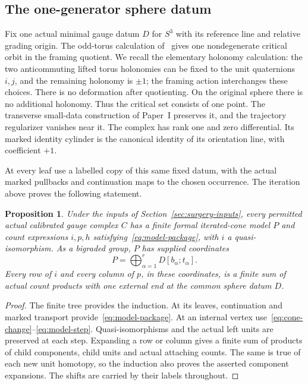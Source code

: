 \documentclass[11pt]{amsart}
\newtheorem{proposition}[theorem]{Proposition}
\theoremstyle{definition}
\theoremstyle{remark}
\theoremstyle{plain}
\begin{document}
\subsection{The one-generator sphere datum}
Fix one actual minimal gauge datum $D$ for $S^3$ with its reference
line and relative grading origin. The odd-torus calculation
of~\cite[Section~7.6]{Scaduto} gives one nondegenerate critical
orbit in the framing quotient. We recall the elementary holonomy
calculation: the two anticommuting
lifted torus holonomies can be fixed to the unit quaternions
$i,j$, and the remaining holonomy is $\pm1$; the framing action
interchanges these choices. There is no deformation after
quotienting. On the original sphere there is no additional
holonomy. Thus the critical set consists of one point.
The transverse small-data construction of Paper~I preserves it,
and the trajectory regularizer vanishes near it. The complex
has rank one and zero differential. Its marked identity cylinder
is the canonical identity of its orientation line, with
coefficient $+1$.

At every leaf use a labelled copy of this same fixed datum, with
the actual marked pullbacks and continuation maps to the chosen
occurrence. The iteration above proves the following statement.

\begin{proposition}\label{prop:finite-model}
Under the inputs of Section~\ref{sec:surgery-inputs}, every
permitted actual calibrated gauge complex $C$ has a finite
formal iterated-cone model $P$ and count expressions
$i,p,h$ satisfying~\eqref{eq:model-package}, with $i$ a
quasi-isomorphism. As a bigraded group, $P$ has supplied coordinates
\begin{equation}\label{eq:leaf-model}
 P=\bigoplus_{\alpha=1}^r D[b_\alpha;t_\alpha].
\end{equation}
Every row of $i$ and every column of $p$, in these coordinates,
is a finite sum of actual count products with one external end
at the common sphere datum $D$.
\end{proposition}
\begin{proof}
The finite tree provides the induction. At its leaves,
continuation and marked transport provide~\eqref{eq:model-package}.
At an internal vertex use~\eqref{eq:cone-change}--\eqref{eq:model-step}.
Quasi-isomorphisms and the actual left units are preserved at
each step. Expanding a row or column gives a finite sum of
products of child components, child units and actual attaching
counts. The same is true of each new unit homotopy, so the
induction also proves the asserted component expansions.
The shifts are carried by their labels throughout.
\end{proof}
\end{document}
